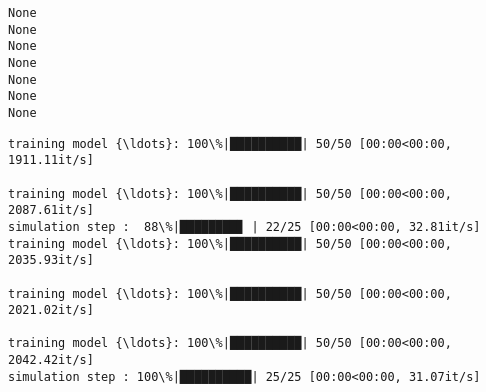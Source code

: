 \documentclass[11pt]{article}
\begin{document}
    \begin{Verbatim}[commandchars=\\\{\}]
None
None
None
None
None
None
None
    \end{Verbatim}

    \begin{Verbatim}[commandchars=\\\{\}]
training model {\ldots}: 100\%|██████████| 50/50 [00:00<00:00, 1911.11it/s]

training model {\ldots}: 100\%|██████████| 50/50 [00:00<00:00, 2087.61it/s]
simulation step :  88\%|████████▊ | 22/25 [00:00<00:00, 32.81it/s]
training model {\ldots}: 100\%|██████████| 50/50 [00:00<00:00, 2035.93it/s]

training model {\ldots}: 100\%|██████████| 50/50 [00:00<00:00, 2021.02it/s]

training model {\ldots}: 100\%|██████████| 50/50 [00:00<00:00, 2042.42it/s]
simulation step : 100\%|██████████| 25/25 [00:00<00:00, 31.07it/s]
    \end{Verbatim}
\end{document}
